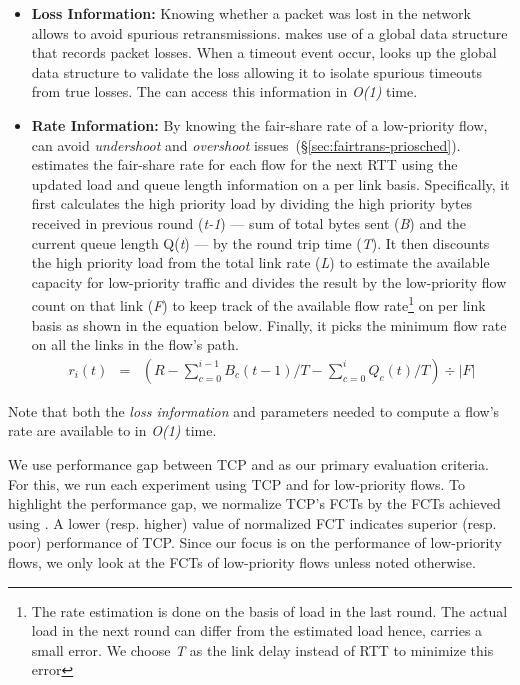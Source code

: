 \begin{itemize}
    \item \textbf{Loss Information:} Knowing whether a packet was lost in the network allows \nearopt{} to avoid spurious retransmissions. \nearopt{} makes use of a global data structure that records packet losses. When a timeout event occur, \nearopt{} looks up the global data structure to validate the loss allowing it to isolate spurious timeouts from true losses. The \nearopt{} can access this information in \textit{O(1)} time.
    
    \item \textbf{Rate Information:} By knowing the fair-share rate of a low-priority flow, \nearopt{} can avoid \emph{undershoot} and \emph{overshoot} issues~(\S\ref{sec:fairtrans-priosched}).
    \nearopt{} estimates the fair-share rate for each flow for the next RTT using the updated load and queue length information on a per link basis. 
    Specifically, it first calculates the high priority load by dividing the high priority bytes received in previous round (\emph{t-1}) --- sum of total bytes sent (\emph{B}) and the current queue length Q(\emph{t}) ---  by the round trip time (\emph{T}). 
    It then discounts the high priority load from the total link rate (\emph{L}) to estimate the available capacity for low-priority traffic and divides the result by the low-priority flow count on that link (\emph{F}) to keep track of the available flow rate\footnote{The rate estimation is done on the basis of load in the last round. The actual load in the next round can differ from the estimated load hence, \nearopt{} carries a small error. We choose \emph{T} as the link delay instead of RTT to minimize this error} on per link basis as shown in the equation below. Finally, it picks the minimum flow rate on all the links in the flow's path.
    \begin{eqnarray*}
        r_i(t) &=& \left(R - \sum_{c=0}^{i-1} B_c(t-1)/T - \sum_{c=0}^i Q_c(t)/T\right) \div |F|
    \end{eqnarray*}
    
\end{itemize}
Note that both the \emph{loss information} and parameters needed to compute a flow's rate are available to \nearopt{} in \emph{O(1)} time.

We use performance gap between TCP and \nearopt{} as our primary evaluation criteria. For this, we run each experiment using TCP and \nearopt{} for low-priority flows.
To highlight the performance gap, we normalize TCP's FCTs by the FCTs achieved using \nearopt{}. A lower (resp. higher) value of normalized FCT indicates superior (resp. poor) performance of TCP.
Since our focus is on the performance of low-priority flows, we only look at the FCTs of low-priority flows unless noted otherwise. 

